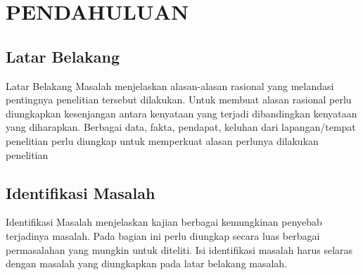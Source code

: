 \chapter{PENDAHULUAN}

\section{Latar Belakang}
Latar Belakang Masalah menjelaskan alasan-alasan rasional yang melandasi pentingnya penelitian tersebut dilakukan. Untuk membuat alasan rasional perlu diungkapkan kesenjangan antara kenyataan yang terjadi dibandingkan kenyataan yang diharapkan. Berbagai data, fakta, pendapat, keluhan dari lapangan/tempat penelitian perlu diungkap untuk memperkuat alasan perlunya dilakukan penelitian~\cite{Ver}

\section{Identifikasi Masalah}
Identifikasi Masalah menjelaskan kajian berbagai kemungkinan penyebab terjadinya masalah. Pada bagian ini perlu diungkap secara luas berbagai permasalahan yang mungkin untuk diteliti. Isi identifikasi masalah harus selaras dengan masalah yang diungkapkan pada latar belakang masalah.

